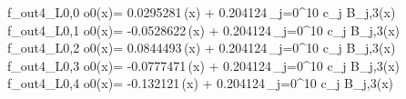 f_{out4_L0,0	o0}(x)= 0.0295281\,\phi(x) + 0.204124\,\sum_{j=0}^{10} c_j B_{j,3}(x)
f_{out4_L0,1	o0}(x)= -0.0528622\,\phi(x) + 0.204124\,\sum_{j=0}^{10} c_j B_{j,3}(x)
f_{out4_L0,2	o0}(x)= 0.0844493\,\phi(x) + 0.204124\,\sum_{j=0}^{10} c_j B_{j,3}(x)
f_{out4_L0,3	o0}(x)= -0.0777471\,\phi(x) + 0.204124\,\sum_{j=0}^{10} c_j B_{j,3}(x)
f_{out4_L0,4	o0}(x)= -0.132121\,\phi(x) + 0.204124\,\sum_{j=0}^{10} c_j B_{j,3}(x)
